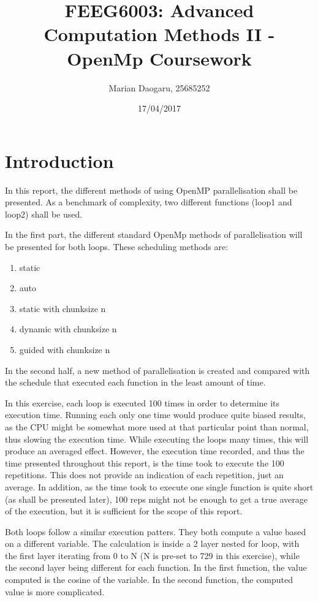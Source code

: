 \documentclass[12pt]{article}
\title{FEEG6003: Advanced Computation Methods II - OpenMp Coursework}
\author{Marian Daogaru, 25685252}
\date{17/04/2017}
\begin{document}
	\maketitle
	
	\pagebreak
	\section{Introduction}
	In this report, the different methods of using OpenMP parallelisation shall be presented. As a benchmark of complexity, two different functions (loop1 and loop2) shall be used. 
	
	In the first part, the different standard OpenMp methods of parallelisation will be presented for both loops. These scheduling methods are:
		\begin{enumerate}
			\item static 
			\item auto
			\item static with chunksize n
			\item dynamic with chunksize n
			\item guided with chunksize n
		\end{enumerate}
	
	In the second half, a new method of parallelisation is created and compared with the schedule that executed each function in the least amount of time.
	
	In this exercise, each loop is executed 100 times in order to determine its execution time. Running each only one time would produce quite biased results, as the CPU might be somewhat more used at that particular point than normal, thus slowing the execution time. While executing the loops many times, this will produce an averaged effect. However, the execution time recorded, and thus the time presented throughout this report, is the time took to execute the 100 repetitions. This does not provide an indication of each repetition, just an average. In addition, as the time took to execute one single function is quite short (as shall be presented later), 100 reps might not be enough to get a true average of the execution, but it is sufficient for the scope of this report.
	
	Both loops follow a similar execution patters. They both compute a value based on a different variable. The calculation is inside a 2 layer nested for loop, with the first layer iterating from 0 to N (N is pre-set to 729 in this exercise), while the second layer being different for each function. In the first function, the value computed is the cosine of the variable. In the second function, the computed value is more complicated. 
	
\end{document}
